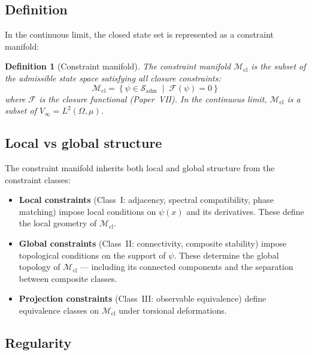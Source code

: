 \documentclass[12pt]{article}
\newtheorem{definition}[theorem]{Definition}
\newcommand{\Mcl}{\mathcal{M}_{\mathrm{cl}}}
\newcommand{\Fcal}{\mathcal{F}}
\newcommand{\Sadm}{\mathcal{S}_{\mathrm{adm}}}
\begin{document}
\subsection{Definition}

In the continuous limit, the closed state set is represented as a constraint manifold:

\begin{definition}[Constraint manifold]\label{def:manifold}
The constraint manifold $\Mcl$ is the subset of the admissible state space satisfying all closure constraints:
\begin{equation}
    \Mcl = \left\{\psi \in \Sadm \;\middle|\; \Fcal(\psi) = 0\right\}
\end{equation}
where $\Fcal$ is the closure functional (Paper~VII). In the continuous limit, $\Mcl$ is a subset of $V_\infty = L^2(\Omega, \mu)$.
\end{definition}

\subsection{Local vs global structure}

The constraint manifold inherits both local and global structure from the constraint classes:

\begin{itemize}
    \item \textbf{Local constraints} (Class~I: adjacency, spectral compatibility, phase matching) impose local conditions on $\psi(x)$ and its derivatives. These define the local geometry of $\Mcl$.
    \item \textbf{Global constraints} (Class~II: connectivity, composite stability) impose topological conditions on the support of $\psi$. These determine the global topology of $\Mcl$ --- including its connected components and the separation between composite classes.
    \item \textbf{Projection constraints} (Class~III: observable equivalence) define equivalence classes on $\Mcl$ under torsional deformations.
\end{itemize}

\subsection{Regularity}
\end{document}

